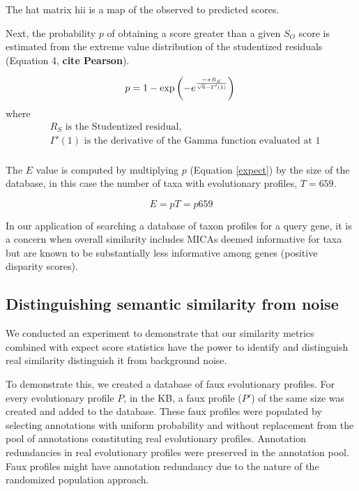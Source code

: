 \documentclass{article}
\begin{document}

The hat matrix hii is a map of the observed to predicted scores.

Next, the probability $p$ of obtaining a score greater than a given $S_O$ score is estimated from the extreme value distribution of the studentized residuals (Equation 4, \textbf{cite Pearson}).

\begin{equation}
\label{pvalue}
p=1-\exp \left( {-e^{\frac{-\pi R_S }{\sqrt{6} - \Gamma'(1)}}} \right) \\
\end{equation}
where 
\begin{align*}
& R_S \textrm{ is the Studentized residual,} \\
& \Gamma'(1) \textrm{ is the derivative of the Gamma function evaluated at 1}
 \\
\end{align*}

The $E$ value is computed by multiplying $p$ (Equation \ref{expect}) by the size of the database, in this case the number of taxa with evolutionary profiles, $T=659$.

\begin{equation}
\label{expect}
E = pT = p659
\end{equation}


In our application of searching a database of taxon profiles for a query gene, it is a concern when overall similarity includes MICAs deemed informative for taxa but are known to be substantially less informative among genes (positive disparity scores).  %

\subsection{Distinguishing semantic similarity from noise}
We conducted an experiment to demonstrate that our similarity metrics combined with expect score statistics have the power to identify and distinguish real similarity distinguish it from background noise. 

To demonstrate this, we created a database of faux evolutionary profiles. For every evolutionary profile $P$, in the KB, a faux profile ($P'$) of the same size was created and added to the database. These faux profiles were populated by selecting annotations with uniform probability and without replacement from the pool of annotations constituting real evolutionary profiles. Annotation redundancies in real evolutionary profiles were preserved in the annotation pool. Faux profiles might have annotation redundancy due to the nature of the randomized population approach. 
\end{document}
